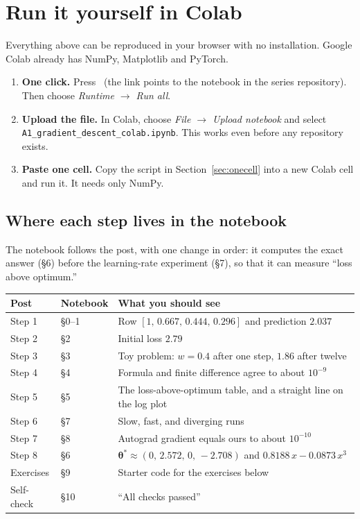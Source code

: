 \documentclass[11pt]{article}
\newcommand{\vth}{\bm{\theta}}
\newcommand{\colaburl}{https://colab.research.google.com/github/YOUR-USER/YOUR-REPO/blob/main/notebooks/A1_gradient_descent_colab.ipynb}
\newcommand{\colabbutton}{%
  \href{\colaburl}{\tcbox[on line,colback=orange!15,colframe=orange!70!black,boxrule=0.6pt,arc=3pt,
    left=4pt,right=4pt,top=1pt,bottom=1pt]{\small\textbf{$\blacktriangleright$ Open in Google Colab}}}}
\begin{document}
\section{Run it yourself in Colab}
\label{sec:runit}
Everything above can be reproduced in your browser with no installation. Google Colab already has NumPy, Matplotlib and PyTorch.

\begin{keybox}
\begin{enumerate}[nosep]
  \item \textbf{One click.} Press \colabbutton\ (the link points to the notebook in the series repository). Then choose \emph{Runtime $\to$ Run all}.
  \item \textbf{Upload the file.} In Colab, choose \emph{File $\to$ Upload notebook} and select \texttt{A1\_gradient\_descent\_colab.ipynb}. This works even before any repository exists.
  \item \textbf{Paste one cell.} Copy the script in Section~\ref{sec:onecell} into a new Colab cell and run it. It needs only NumPy.
\end{enumerate}
\end{keybox}

\subsection{Where each step lives in the notebook}
The notebook follows the post, with one change in order: it computes the exact answer (\S6) before the learning-rate experiment (\S7), so that it can measure ``loss above optimum.''

\begin{center}
\small
\begin{tabular}{@{}llp{6.6cm}@{}}
\toprule
Post & Notebook & What you should see\\
\midrule
Step 1 & \S0--1 & Row $[1,\,0.667,\,0.444,\,0.296]$ and prediction $2.037$\\
Step 2 & \S2 & Initial loss $2.79$\\
Step 3 & \S3 & Toy problem: $w=0.4$ after one step, $1.86$ after twelve\\
Step 4 & \S4 & Formula and finite difference agree to about $10^{-9}$\\
Step 5 & \S5 & The loss-above-optimum table, and a straight line on the log plot\\
Step 6 & \S7 & Slow, fast, and diverging runs\\
Step 7 & \S8 & Autograd gradient equals ours to about $10^{-10}$\\
Step 8 & \S6 & $\vth^\ast\approx(0,\,2.572,\,0,\,-2.708)$ and $0.8188\,x-0.0873\,x^3$\\
Exercises & \S9 & Starter code for the exercises below\\
Self-check & \S10 & ``All checks passed''\\
\bottomrule
\end{tabular}
\end{center}
\end{document}
